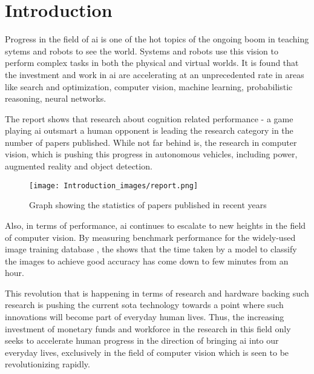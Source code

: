 \pagestyle{fancy}
\fancyhf{}
\lhead{\thepage}


\chapter{Introduction}

Progress in the field of \ac{ai} is one of the hot topics of the ongoing boom in teaching sytems and robots to see the world. Systems and robots use this vision to perform complex tasks in both the physical and virtual worlds. It is found that the investment and work in \ac{ai} are accelerating at an unprecedented rate in areas like search and optimization, computer vision, machine learning, probabilistic reasoning, neural networks. 


\par

The report \cite{aii} shows that research about cognition related performance - a game playing \ac{ai} outsmart a human opponent is leading the research category in the number of papers published. While not far behind is, the research in computer vision, which is pushing this progress in autonomous vehicles, including power, augmented reality and object detection.


\begin{figure}[h!]
    \centering
    \texttt{[image: Introduction\_images/report.png]}
    \caption{Graph showing the statistics of papers published in recent years}
    \label{stats}
\end{figure}

Also, in terms of performance, \ac{ai} continues to escalate to new heights in the field of computer vision. By measuring benchmark performance for the widely-used image training database \cite{ImageNet}, the \cite{aii} shows that the time taken by a model to classify the images to achieve good accuracy has come down to few minutes from an hour.   



\par

This revolution that is happening in terms of research and hardware backing such research is pushing the current \ac{sota} technology towards a point where such innovations will become part of everyday human lives. Thus, the increasing investment of monetary funds and workforce in the research in this field only seeks to accelerate human progress in the direction of bringing \ac{ai} into our everyday lives, exclusively in the field of computer vision which is seen to be revolutionizing rapidly.  


